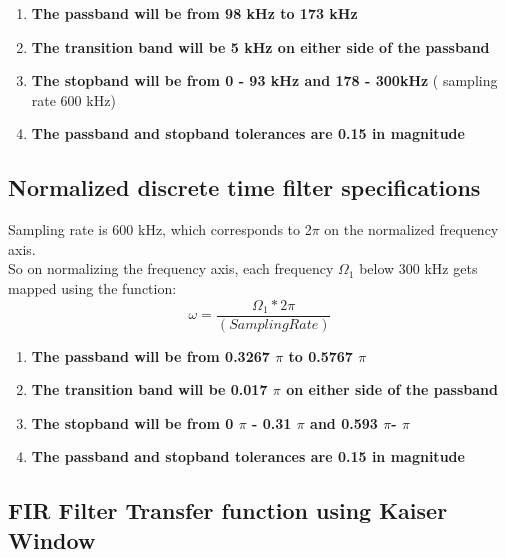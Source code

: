 \documentclass[12pt]{article}
\begin{document}
    \begin{enumerate}
    \item \textbf{The passband will be from 98 kHz to 173 kHz}
    \item \textbf{The transition band will be 5 kHz on either side of the passband}
    \item \textbf{The stopband will be from 0 - 93 kHz and 178 - 300kHz} ( sampling rate 600 kHz)
    \item \textbf{The passband and stopband tolerances are 0.15 in magnitude}

\end{enumerate}
\subsection{Normalized discrete time filter specifications}
Sampling rate is 600 kHz, which corresponds to 2$\pi$ on the normalized frequency axis.
\\So on normalizing the frequency axis, each frequency $\Omega_1$ below 300 kHz gets mapped using the function:
\begin{equation}
    \omega=\frac{\Omega_1 * 2 \pi}{(Sampling Rate)}
\end{equation}
\begin{enumerate}
    \item \textbf{The passband will be from 0.3267 $\pi$ to 0.5767 $\pi$}
    \item \textbf{The transition band will be 0.017 $\pi$ on either side of the passband}
    \item \textbf{The stopband will be from 0 $\pi$ - 0.31 $\pi$ and 0.593 $\pi$- $\pi$}
    \item \textbf{The passband and stopband tolerances are 0.15 in magnitude}

\end{enumerate}
\newpage

\subsection{FIR Filter Transfer function using Kaiser
Window}
\end{document}
